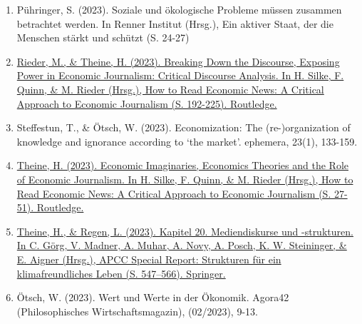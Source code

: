 \begin{enumerate}
	 \item Pühringer, S. (2023). Soziale und ökologische Probleme müssen zusammen betrachtet werden. In Renner Institut (Hrsg.), Ein aktiver Staat, der die Menschen stärkt und schützt (S. 24-27)
	 \item \href{https://doi.org/10.4324/9781003154747-11}{Rieder, M., \& Theine, H. (2023). Breaking Down the Discourse, Exposing Power in Economic Journalism: Critical Discourse Analysis. In H. Silke, F. Quinn, \& M. Rieder (Hrsg.), How to Read Economic News: A Critical Approach to Economic Journalism (S. 192-225). Routledge.}
	 \item Steffestun, T., \& Ötsch, W. (2023). Economization: The (re-)organization of knowledge and ignorance according to ‘the market’. ephemera, 23(1), 133-159.
	 \item \href{https://doi.org/10.4324/9781003154747-3}{Theine, H. (2023). Economic Imaginaries, Economics Theories and the Role of Economic Journalism. In H. Silke, F. Quinn, \& M. Rieder (Hrsg.), How to Read Economic News: A Critical Approach to Economic Journalism (S. 27-51). Routledge.}
	 \item \href{https://doi.org/10.1007/978-3-662-66497-1_24}{Theine, H., \& Regen, L. (2023). Kapitel 20. Mediendiskurse und -strukturen. In C. Görg, V. Madner, A. Muhar, A. Novy, A. Posch, K. W. Steininger, \& E. Aigner (Hrsg.), APCC Special Report: Strukturen für ein klimafreundliches Leben (S. 547–566). Springer.}
	 \item Ötsch, W. (2023). Wert und Werte in der Ökonomik. Agora42 (Philosophisches Wirtschaftsmagazin), (02/2023), 9-13.
\end{enumerate}
